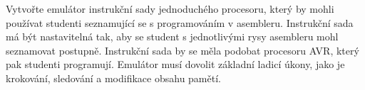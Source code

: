 Vytvořte emulátor instrukční sady jednoduchého procesoru, který by mohli používat studenti seznamující se s programováním v asembleru. Instrukční sada má být nastavitelná tak, aby se student s jednotlivými rysy asembleru mohl seznamovat postupně. Instrukční sada by se měla podobat procesoru AVR, který pak studenti programují. Emulátor musí dovolit základní ladicí úkony, jako je krokování, sledování a modifikace obsahu pamětí.